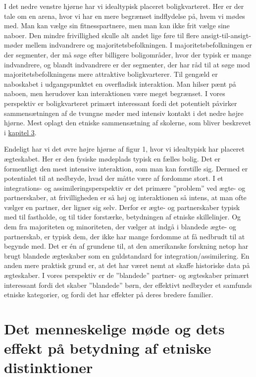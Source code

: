 \documentclass[
]{book}
\begin{document}
I det nedre venstre hjørne har vi idealtypisk placeret boligkvarteret. Her er der tale om en arena, hvor vi har en mere begrænset indflydelse på, hvem vi mødes med. Man kan vælge sin fitnesspartnere, men man kan ikke frit vælge sine naboer. Den mindre frivillighed skulle alt andet lige føre til flere ansigt-til-ansigt-møder mellem indvandrere og majoritetsbefolkningen. I majoritetsbefolkningen er der segmenter, der må søge efter billigere boligområder, hvor der typisk er mange indvandrere, og blandt indvandrere er der segmenter, der har råd til at søge mod majoritetsbefolkningens mere attraktive boligkvarterer. Til gengæld er naboskabet i udgangspunktet en overfladisk interaktion. Man hilser pænt på naboen, men herudover kan interaktionen være meget begrænset. I vores perspektiv er boligkvarteret primært interessant fordi det potentielt påvirker sammensætningen af de tvungne møder med intensiv kontakt i det nedre højre hjørne. Mest oplagt den etniske sammensætning af skolerne, som bliver beskrevet i \hyperref[kap3]{kapitel 3}.

Endeligt har vi det øvre højre hjørne af figur 1, hvor vi idealtypisk har placeret ægteskabet. Her er den fysiske mødeplads typisk en fælles bolig. Det er formentligt den mest intensive interaktion, som man kan forstille sig. Dermed er potentialet til at nedbryde, hvad der måtte være af fordomme stort. I et integrations- og assimileringsperspektiv er det primære ''problem'' ved ægte- og partnerskaber, at frivilligheden er så høj og interaktionen så intens, at man ofte vælger en partner, der ligner sig selv. Derfor er ægte- og partnerskaber typisk med til fastholde, og til tider forstærke, betydningen af etniske skillelinjer. Og dem fra majoriteten og minoriteten, der vælger at indgå i blandede ægte- og partnerskab, er typisk dem, der ikke har mange fordomme at få nedbrudt til at begynde med. Det er én af grundene til, at den amerikanske forskning netop har brugt blandede ægteskaber som en guldstandard for integration/assimilering. En anden mere praktisk grund er, at det har været nemt at skaffe historiske data på ægteskaber. I vores perspektiv er de ''blandede'' partner- og ægteskaber primært interessant fordi det skaber ''blandede'' børn, der effektivt nedbryder et samfunds etniske kategorier, og fordi det har effekter på deres bredere familier.

\section{Det menneskelige møde og dets effekt på betydning af etniske distinktioner}\label{det-menneskelige-muxf8de-og-dets-effekt-puxe5-betydning-af-etniske-distinktioner}
\end{document}
